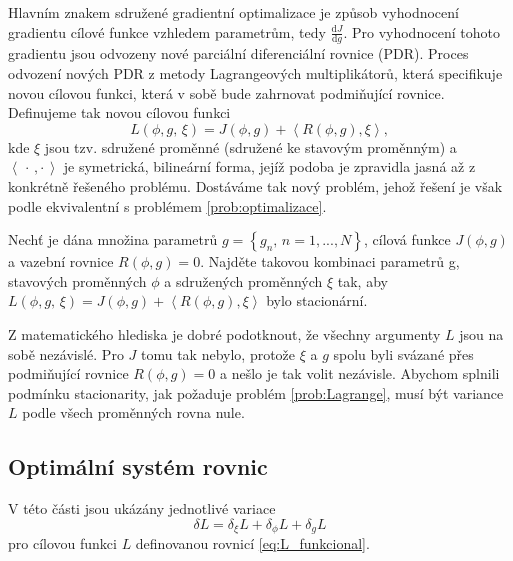 Hlavním znakem sdružené gradientní optimalizace je způsob vyhodnocení gradientu cílové funkce vzhledem parametrům, tedy $ \frac{\mathrm{d}J}{\mathrm{d}g} $. 
Pro vyhodnocení tohoto gradientu jsou odvozeny nové parciální diferenciální rovnice (PDR).
Proces odvození nových PDR z metody Lagrangeových multiplikátorů, která specifikuje novou cílovou funkci, která v sobě bude zahrnovat podmiňující rovnice. 
Definujeme tak novou cílovou funkci 
\begin{equation}\label{eq:L_funkcional}
L(\phi, g,\,\xi) = J(\phi, g) + \left\langle R(\phi, g),\xi \right\rangle,
\end{equation}
kde $ \xi $ jsou tzv. sdružené proměnné (sdružené ke stavovým proměnným) a $  \left\langle \, \cdot\,,\cdot \,  \right\rangle $ je symetrická, bilineární forma, jejíž podoba je zpravidla jasná až z konkrétně řešeného problému.
Dostáváme tak nový problém, jehož řešení je však podle \cite{karman1997inverse} ekvivalentní s problémem \ref{prob:optimalizace}.

\begin{problem}\label{prob:Lagrange}
Nechť je dána množina parametrů $ g=\left\lbrace g_n, \, n=1,...,N\right\rbrace $, cílová funkce $ J(\phi, g) $ a vazební rovnice $ R(\phi, g)=0 $.
Najděte takovou kombinaci parametrů g, stavových proměnných $ \phi $ a sdružených proměnných $ \xi $ tak, aby $ L(\phi, g,\,\xi) = J(\phi, g) + \left\langle R(\phi, g),\xi \right\rangle$ bylo  stacionární.
\end{problem}

Z matematického hlediska je dobré podotknout, že všechny argumenty $ L $ jsou na sobě nezávislé. Pro $ J $ tomu tak nebylo, protože $ \xi $ a $ g $ spolu byli svázané přes podmiňující rovnice $ R(\phi, g)=0 $ a nešlo je tak volit nezávisle. Abychom splnili podmínku stacionarity, jak požaduje problém \ref{prob:Lagrange}, musí být variance $ L $ podle všech proměnných rovna nule.

\subsection{Optimální systém rovnic}
V této části jsou ukázány jednotlivé variace 
\begin{equation}\label{eq:L_variace}
\delta L = \delta_\xi L + \delta_\phi L + \delta_g L
\end{equation} 
pro cílovou funkci $ L $ definovanou rovnicí \ref{eq:L_funkcional}.
